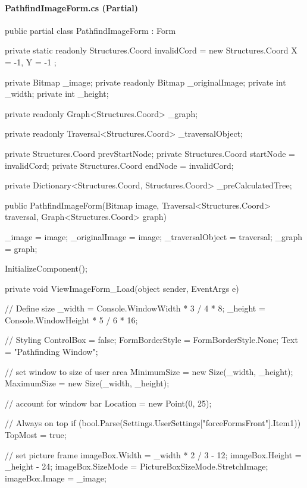 \begin{flushleft}
    
    \paragraph{PathfindImageForm.cs (Partial)}
    \begin{cscode}
public partial class PathfindImageForm : Form
{
    private static readonly Structures.Coord invalidCord = new Structures.Coord { X = -1, Y = -1 };

    private Bitmap _image;
    private readonly Bitmap _originalImage;
    private int _width;
    private int _height;

    private readonly Graph<Structures.Coord> _graph;

    private readonly Traversal<Structures.Coord> _traversalObject;

    private Structures.Coord prevStartNode;
    private Structures.Coord startNode = invalidCord;
    private Structures.Coord endNode = invalidCord;

    private Dictionary<Structures.Coord, Structures.Coord> _preCalculatedTree;

    public PathfindImageForm(Bitmap image, Traversal<Structures.Coord> traversal, Graph<Structures.Coord> graph)
    {
        _image = image;
        _originalImage = image;
        _traversalObject = traversal;
        _graph = graph;

        InitializeComponent();
    }

    private void ViewImageForm_Load(object sender, EventArgs e)
    {
        // Define size
        _width = Console.WindowWidth * 3 / 4 * 8;
        _height = Console.WindowHeight * 5 / 6 * 16;


        // Styling
        ControlBox = false;
        FormBorderStyle = FormBorderStyle.None;
        Text = "Pathfinding Window";

        // set window to size of user area
        MinimumSize = new Size(_width, _height);
        MaximumSize = new Size(_width, _height);

        // account for window bar
        Location = new Point(0, 25);

        // Always on top
        if (bool.Parse(Settings.UserSettings["forceFormsFront"].Item1)) TopMost = true;

        // set picture frame
        imageBox.Width = _width * 2 / 3 - 12;
        imageBox.Height = _height - 24;
        imageBox.SizeMode = PictureBoxSizeMode.StretchImage;
        imageBox.Image = _image;

}}
\end{cscode}
\end{flushleft}
